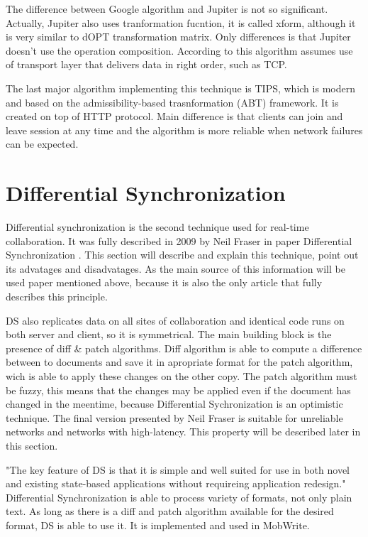 \documentclass[12pt,oneside]{fithesis2}
\begin{document}
\par The difference between Google algorithm and Jupiter is not so significant. Actually, Jupiter also uses tranformation fucntion, it is called xform, although it is very similar to dOPT transformation matrix. Only differences is that Jupiter doesn't use the operation composition. According to \cite{Jupiter} this algorithm assumes use of transport layer that delivers data in right order, such as TCP.
\par The last major algorithm implementing this technique is TIPS, which is modern and based on the admissibility-based trasnformation (ABT) framework. It is created on top of HTTP protocol. Main difference is that clients can join and leave session at any time and the algorithm is more reliable when network failures can be expected. 
\section{Differential Synchronization}
\par Differential synchronization is the second technique used for real-time collaboration. It was fully described in 2009 by Neil Fraser in paper Differential Synchronization \cite{Fraser}. This section will describe and explain this technique, point out its advatages and disadvatages. As the main source of this information will be used paper mentioned above, because it is also the only article that fully describes this principle.
\par DS also replicates data on all sites of collaboration and identical code runs on both server and client, so it is symmetrical. The main building block is the presence of diff \& patch algorithms. Diff algorithm is able to compute a difference between to documents and save it in apropriate format for the patch algorithm, wich is able to apply these changes on the other copy. The patch algorithm must be fuzzy, this means that the changes may be applied even if the document has changed in the meentime, because Differential Sychronization is an optimistic technique. The final version presented by Neil Fraser is suitable for unreliable networks and networks with high-latency. This property will be described later in this section.
\par "The key feature of DS is that it is simple and well suited for use in both novel and existing state-based applications without requireing application redesign." \cite{Fraser} Differential Synchronization is able to process variety of formats, not only plain text. As long as there is a diff and patch algorithm available for the desired format, DS is able to use it. It is implemented and used in MobWrite. 
\end{document}
